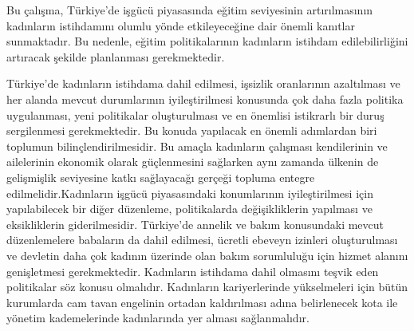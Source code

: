 \documentclass[
  11pt,
  a4paper,
  DIV=11,
  numbers=noendperiod]{scrartcl}
\begin{document}
Bu çalışma, Türkiye'de işgücü piyasasında eğitim seviyesinin
artırılmasının kadınların istihdamını olumlu yönde etkileyeceğine dair
önemli kanıtlar sunmaktadır. Bu nedenle, eğitim politikalarının
kadınların istihdam edilebilirliğini artıracak şekilde planlanması
gerekmektedir.

Türkiye'de kadınların istihdama dahil edilmesi, işsizlik oranlarının
azaltılması ve her alanda mevcut durumlarının iyileştirilmesi konusunda
çok daha fazla politika uygulanması, yeni politikalar oluşturulması ve
en önemlisi istikrarlı bir duruş sergilenmesi gerekmektedir. Bu konuda
yapılacak en önemli adımlardan biri toplumun bilinçlendirilmesidir. Bu
amaçla kadınların çalışması kendilerinin ve ailelerinin ekonomik olarak
güçlenmesini sağlarken aynı zamanda ülkenin de gelişmişlik seviyesine
katkı sağlayacağı gerçeği topluma entegre edilmelidir.Kadınların işgücü
piyasasındaki konumlarının iyileştirilmesi için yapılabilecek bir diğer
düzenleme, politikalarda değişikliklerin yapılması ve eksikliklerin
giderilmesidir. Türkiye'de annelik ve bakım konusundaki mevcut
düzenlemelere babaların da dahil edilmesi, ücretli ebeveyn izinleri
oluşturulması ve devletin daha çok kadının üzerinde olan bakım
sorumluluğu için hizmet alanını genişletmesi gerekmektedir. Kadınların
istihdama dahil olmasını teşvik eden politikalar söz konusu olmalıdır.
Kadınların kariyerlerinde yükselmeleri için bütün kurumlarda cam tavan
engelinin ortadan kaldırılması adına belirlenecek kota ile yönetim
kademelerinde kadınlarında yer alması sağlanmalıdır.
\end{document}
